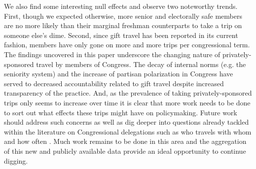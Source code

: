 \documentclass[12pt]{article}                           %
\begin{document}
We also find some interesting null effects and observe two noteworthy trends. First, though we expected otherwise, more senior and electorally safe members are no more likely than their marginal freshman counterparts to take a trip on someone else's dime. Second, since gift travel has been reported in its current fashion, members have only gone on more and more trips per congressional term. The findings uncovered in this paper underscore the changing nature of privately-sponsored travel by members of Congress. The decay of internal norms (e.g. the seniority system) and the increase of partisan polarization in Congress have served to decreased accountability related to gift travel despite increased transparency of the practice. And, as the prevalence of taking privately-sponsored trips only seems to increase over time it is clear that more work needs to be done to sort out what effects these trips might have on policymaking. Future work should address such concerns as well as dig deeper into questions already tackled within the literature on Congressional delegations such as who travels with whom and how often \citep{Alduncin2014,Alduncin2017}. Much work remains to be done in this area and the aggregation of this new and publicly available data provide an ideal opportunity to continue digging.

\newpage
\theendnotes
\end{document}
